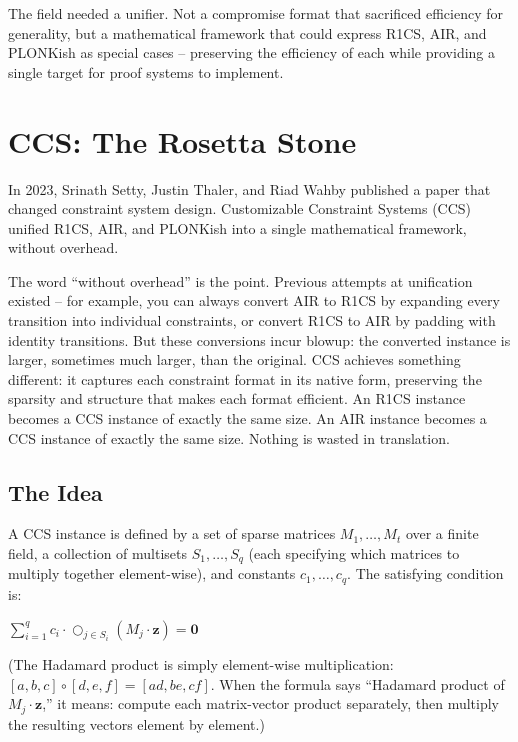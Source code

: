 \documentclass[
  11pt,
  openany]{report}
\begin{document}
The field needed a unifier. Not a compromise format that sacrificed efficiency
for generality, but a mathematical framework that could express R1CS, AIR, and
PLONKish as special cases -- preserving the efficiency of each while providing a
single target for proof systems to implement.

\section{CCS: The Rosetta Stone}\label{ccs-the-rosetta-stone}

In 2023, Srinath Setty, Justin Thaler, and Riad Wahby published a paper that
changed constraint system design. Customizable Constraint Systems (CCS) unified
R1CS, AIR, and PLONKish into a single mathematical framework, without overhead.

The word ``without overhead'' is the point. Previous attempts at unification
existed -- for example, you can always convert AIR to R1CS by expanding every
transition into individual constraints, or convert R1CS to AIR by padding with
identity transitions. But these conversions incur blowup: the converted instance
is larger, sometimes much larger, than the original. CCS achieves something
different: it captures each constraint format in its native form, preserving the
sparsity and structure that makes each format efficient. An R1CS instance
becomes a CCS instance of exactly the same size. An AIR instance becomes a CCS
instance of exactly the same size. Nothing is wasted in translation.

\subsection{The Idea}\label{the-idea}

A CCS instance is defined by a set of sparse matrices \(M_1, \ldots, M_t\) over
a finite field, a collection of multisets \(S_1, \ldots, S_q\) (each specifying
which matrices to multiply together element-wise), and constants
\(c_1, \ldots, c_q\). The satisfying condition is:

\(\sum_{i=1}^{q} c_i \cdot \bigcirc_{j \in S_i} (M_j \cdot \mathbf{z}) = \mathbf{0}\)

(The Hadamard product is simply element-wise multiplication:
\([a, b, c] \circ [d, e, f] = [ad, be, cf]\). When the formula says ``Hadamard
product of \(M_j \cdot \mathbf{z}\),'' it means: compute each matrix-vector
product separately, then multiply the resulting vectors element by element.)
\end{document}
